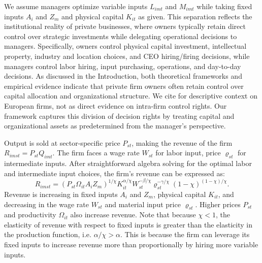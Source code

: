 We assume managers optimize variable inputs $L_{imt}$ and $M_{imt}$ while taking fixed inputs $A_{i}$ and $Z_m$ and physical capital $K_{it}$ as given. This separation reflects the institutional reality of private businesses, where owners typically retain direct control over strategic investments while delegating operational decisions to managers. Specifically, owners control physical capital investment, intellectual property, industry and location choices, and CEO hiring/firing decisions, while managers control labor hiring, input purchasing, operations, and day-to-day decisions. As discussed in the Introduction, both theoretical frameworks \citep{fama1983separation, jensen1976theory, burkart2003family} and empirical evidence \citep{bloom2012organization} indicate that private firm owners often retain control over capital allocation and organizational structure. We cite \citet{Navaretti2010EFIGE} for descriptive context on European firms, not as direct evidence on intra-firm control rights. Our framework captures this division of decision rights by treating capital and organizational assets as predetermined from the manager's perspective.

Output is sold at sector-specific price $P_{st}$, making the revenue of the firm $R_{imst} = P_{st}Q_{imt}$. The firm faces a wage rate $W_{st}$ for labor input, price $\varrho_{st}$ for intermediate inputs. After straightforward algebra solving for the optimal labor and intermediate input choices, the firm's revenue can be expressed as:
\begin{equation}\label{eq:revenue}
R_{imst} = (P_{st}\Omega_{it}A_i Z_m)^{1/\chi}
K_{it}^{\alpha/\chi}
W_{st}^{-\beta/\chi}
\varrho_{st}^{-\gamma/\chi}
(1-\chi)^{(1-\chi)/\chi}.
\end{equation}
Revenue is increasing in fixed inputs $A_i$ and $Z_m$, physical capital $K_{it}$, and decreasing in the wage rate $W_{st}$ and material input price $\varrho_{st}$. Higher prices $P_{st}$ and productivity $\Omega_{it}$ also increase revenue. Note that because $\chi<1$, the elasticity of revenue with respect to fixed inputs is greater than the elasticity in the production function, i.e. $\alpha/\chi > \alpha$. This is because the firm can leverage its fixed inputs to increase revenue more than proportionally by hiring more variable inputs.

